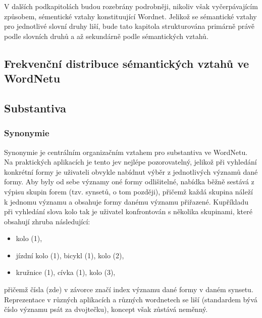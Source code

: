 \documentclass[a4paper, 11pt, oneside]{book}
\newcommand\ex{\textsf}
\begin{document}
			V dalších podkapitolách budou rozebrány podrobněji, nikoliv však vyčerpávajícím způsobem, sémentické vztahy konstituující Wordnet. Jelikož se sémantické vztahy pro jednotlivé slovní druhy liší, bude tato kapitola strukturována primárně právě podle slovních druhů a až sekundárně podle sémantických vztahů.


			\subsection{Frekvenční distribuce sémantických vztahů ve WordNetu}


			\subsection{Substantiva}


				\subsubsection{Synonymie}

					Synonymie je centrálním organizačním vztahem pro substantiva ve WordNetu. Na praktických aplikacích je tento jev nejlépe pozorovatelný, jelikož při vyhledání konkrétní formy je uživateli obvykle nabídnut výběr z jednotlivých významů dané formy. Aby byly od sebe významy oné formy odlišitelné, nabídka běžně sestává z výpisu skupin forem (tzv. synsetů, o tom později), přičemž každá skupina náleží k jednomu významu a obsahuje formy danému významu přiřazené. Kupříkladu při vyhledání slova \ex{kolo} tak je uživatel konfrontován s několika skupinami, které obsahují zhruba následující:

					\begin{itemize}
						\item \ex{kolo (1)},
						\item \ex{jízdní kolo (1), bicykl (1), kolo (2)},
						\item \ex{kružnice (1), cívka (1), kolo (3)},
					\end{itemize}

					přičemž čísla (zde) v závorce značí index významu dané formy v daném synsetu. Reprezentace v různých aplikacích a různých wordnetech se liší (standardem bývá číslo významu psát za dvojtečku), koncept však zůstává neměnný. 
\end{document}
